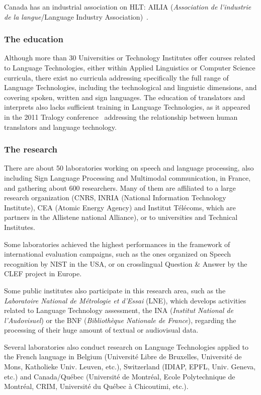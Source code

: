 \begin{multicols}{2}
Canada has an industrial association on HLT: AILIA ({\em Association de
l{\mbox '}industrie de la langue}/Language Industry Association)~\cite{ailia}.

\subsubsection{The education}

Although more than 30 Universities or Technology Institutes offer
courses related to Language Technologies, either within Applied
Linguistics or Computer Science curricula, there exist no curricula
addressing specifically the full range of Language Technologies,
including the technological and linguistic dimensions, and covering
spoken, written and sign languages. The education of translators and
interprets also lacks sufficient training in Language Technologies, as
it appeared in the 2011 Tralogy conference~\cite{tralogy} addressing the
relationship between human translators and language technology.

\subsubsection{The research}

There are about 50 laboratories working on speech and language
processing, also including Sign Language Processing and Multimodal
communication, in France, and gathering about 600 researchers. Many of
them are affiliated to a large research organization (CNRS, INRIA
(National Information Technology Institute), CEA (Atomic Energy
Agency) and Institut Télécoms, which are partners in the Allistene
national Alliance), or to universities and Technical Institutes.

Some laboratories achieved the highest performances in the framework
of international evaluation campaigns, such as the ones organized on
Speech recognition by NIST in the USA, or on crosslingual
Question \& Answer by the CLEF project in Europe.

Some public institutes also participate in this research area, such as
the {\em Laboratoire National de Métrologie et d’Essai} (LNE), which
develops activities related to Language Technology assessment, the INA
({\em Institut National de l’Audovisuel}) or the BNF ({\em Bibliothèque Nationale
de France}), regarding the processing of their huge amount of textual
or audiovisual data.

Several laboratories also conduct research on Language Technologies
applied to the French language in Belgium (Université  Libre de Bruxelles,
Université de Mons, Katholieke Univ. Leuven, etc.), Switzerland
(IDIAP, EPFL, Univ. Geneva, etc.) and Canada/Québec (Université de
Montréal, Ecole Polytechnique de Montréal, CRIM, Université du Québec
à Chicoutimi, etc.).


\end{multicols}
